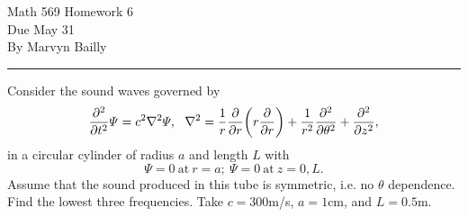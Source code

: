 \documentclass[12pt]{report}
\begin{document}
\large

\begin{center}
 Math 569 Homework 6\\
 Due May 31\\
 By Marvyn Bailly\\
\end{center}

\normalsize

\hrule



\def\p{\varPsi}
\def\n{\nabla}

\begin{problem}
    Consider the sound waves governed by
    \[
        \ppn{2}{}{t} \p = c^2 \n^2 \p, ~~ \n^2= \frac{1}{r}\pp{}{r}\paren{r\pp{}{r}} + \frac{1}{r^2}\ppn{2}{}{\theta} + \ppn{2}{}{z},
    \] 
    in a circular cylinder of radius $a$ and length $L$ with
    \[
        \p = 0 ~\text{at}~r=a;~\p=0 ~\text{at}~z=0,L.
    \]
    Assume that the sound produced in this tube is symmetric, i.e. no $\theta$ dependence. Find the lowest three frequencies. Take $c=300$m/s, $a=1$cm, and $L=0.5$m.
\end{problem}
\end{document}
